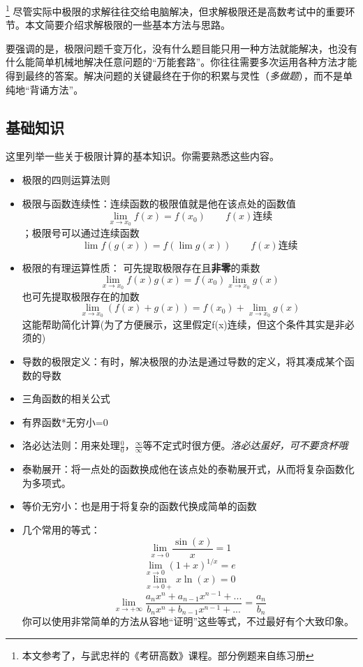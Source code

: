 
\begin{issues}
\issueDraft
\end{issues}
\footnote{本文参考了\cite{同济高}，\cite{Thomas}与武忠祥的《考研高数》课程。部分例题来自练习册}
尽管实际中极限的求解往往交给电脑解决，但求解极限还是高数考试中的重要环节。本文简要介绍求解极限的一些基本方法与思路。

要强调的是，极限问题千变万化，没有什么题目能只用一种方法就能解决，也没有什么能简单机械地解决任意问题的“万能套路”。你往往需要多次运用各种方法才能得到最终的答案。解决问题的关键最终在于你的积累与灵性（\textsl{多做题}），而不是单纯地“背诵方法”。

\subsection{基础知识}
这里列举一些关于极限计算的基本知识。你需要熟悉这些内容。
\begin{itemize}
\item 极限的四则运算法则
\item 极限与函数连续性：连续函数的极限值就是他在该点处的函数值$$\lim _{x \to x_0}f(x) = f(x_0) \qquad f(x)\text{连续}$$；极限号可以通过连续函数 $$\lim f(g(x)) = f(\lim g(x)) \qquad f(x)\text{连续}$$
\item 极限的有理运算性质：
可先提取极限存在且\textbf{非零}的乘数 
$$\lim_{x\to x_0} f(x)g(x) = f(x_0)\lim_{x\to x_0} g(x)$$
也可先提取极限存在的加数
$$\lim_{x\to x_0} (f(x)+g(x)) = f(x_0)+\lim_{x\to x_0} g(x)$$
这能帮助简化计算(为了方便展示，这里假定f(x)连续，但这个条件其实是非必须的)
\item 导数的极限定义：有时，解决极限的办法是通过导数的定义，将其凑成某个函数的导数
\item 三角函数的相关公式
\item 有界函数*无穷小=0
\item 洛必达法则：用来处理$\frac{0}{0}$，$\frac{\infty}{\infty}$等不定式时很方便。\textsl{洛必达虽好，可不要贪杯哦}
\item 泰勒展开：将一点处的函数换成他在该点处的泰勒展开式，从而将复杂函数化为多项式。
\item 等价无穷小：也是用于将复杂的函数代换成简单的函数
\item 几个常用的等式：
$$\lim_{x\to0} \frac{\sin(x)}{x}=1$$
$$\lim_{x\to0} (1+x)^{1/x}=e$$
$$\lim_{x\to0+} x\ln(x)=0$$
$$\lim_{x\to+\infty} \frac{a_nx^n+a_{n-1}x^{n-1}+...}{b_nx^n+b_{n-1}x^{n-1}+...}=\frac{a_n}{b_n}$$
你可以使用非常简单的方法从容地“证明”这些等式，不过最好有个大致印象。
\end{itemize}

